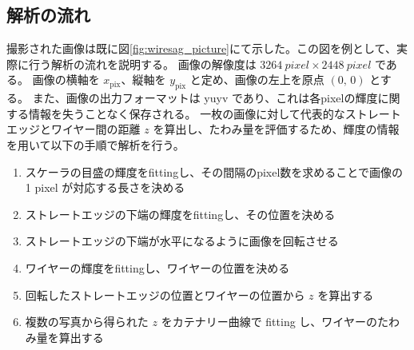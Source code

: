 \documentclass[../../main.tex]{subfiles}
\begin{document}
\subsection{解析の流れ}
撮影された画像は既に図\ref{fig:wiresag_picture}にて示した。この図を例として、実際に行う解析の流れを説明する。
画像の解像度は $\SI{3264}{pixel}\times\SI{2448}{pixel}$ である。
画像の横軸を $x_{\mathrm{pix}}$、縦軸を $y_{\mathrm{pix}}$ と定め、画像の左上を原点 $(0,\,0)$ とする。
また、画像の出力フォーマットは yuyv であり、これは各pixelの輝度に関する情報を失うことなく保存される。
一枚の画像に対して代表的なストレートエッジとワイヤー間の距離 $z$ を算出し、たわみ量を評価するため、輝度の情報を用いて以下の手順で解析を行う。
\begin{enumerate}
    \item スケーラの目盛の輝度をfittingし、その間隔のpixel数を求めることで画像の 1 pixel が対応する長さを決める
    \item ストレートエッジの下端の輝度をfittingし、その位置を決める
    \item ストレートエッジの下端が水平になるように画像を回転させる
    \item ワイヤーの輝度をfittingし、ワイヤーの位置を決める
    \item 回転したストレートエッジの位置とワイヤーの位置から $z$ を算出する
    \item 複数の写真から得られた $z$ をカテナリー曲線で fitting し、ワイヤーのたわみ量を算出する
\end{enumerate}
\end{document}
